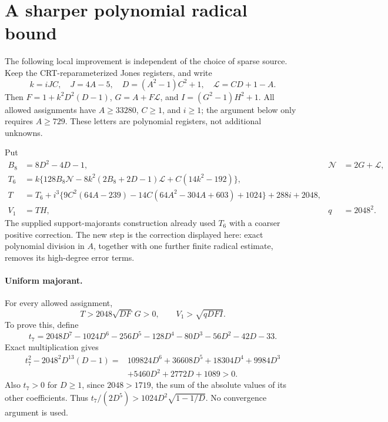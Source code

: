 \section{A sharper polynomial radical bound}\label{sec:quotient-majorant}

The following local improvement is independent of the choice of sparse
source.  Keep the CRT-reparameterized Jones registers, and write
\[
 k=iJC,\quad J=4A-5,\quad D=(A^2-1)C^2+1,\quad
 \mathcal L=CD+1-A.
\]
Then $F=1+k^2D^2(D-1)$, $G=A+F\mathcal L$, and
$I=(G^2-1)H^2+1$.  All allowed assignments have $A\ge33280$,
$C\ge1$, and $i\ge1$; the argument below only requires $A\ge729$.
These letters are polynomial registers, not additional unknowns.

Put
\begin{align*}
 B_8&=8D^2-4D-1, &\mathcal N&=2G+\mathcal L,\\
 T_6&=k\{128B_8\mathcal N
       -8k^2(2B_8+2D-1)\mathcal L+C(14k^2-192)\},\\
 T&=T_6+i^3\{9C^2(64A-239)
       -14C(64A^2-304A+603)+1024\}+288i+2048,\\
 V_1&=TH, &q&=2048^2.
\end{align*}
The supplied support-majorants construction already used $T_6$ with a
coarser positive correction.  The new step is the correction displayed
here: exact polynomial division in $A$, together with one further finite
radical estimate, removes its high-degree error terms.

\paragraph{Uniform majorant.}
For every allowed assignment,
\begin{equation}\label{eq:new-majorant}
 T>2048\sqrt{DF}\,G>0,\qquad V_1>\sqrt{qDFI}.
\end{equation}
To prove this, define
\[
 t_7=2048D^7-1024D^6-256D^5-128D^4-80D^3-56D^2-42D-33.
\]
Exact multiplication gives
\begin{align*}
 t_7^2-2048^2D^{13}(D-1)
 ={}&109824D^6+36608D^5+18304D^4+9984D^3\\
   &+5460D^2+2772D+1089>0.
\end{align*}
Also $t_7>0$ for $D\ge1$, since $2048>1719$, the sum of the absolute
values of its other coefficients.  Thus
$t_7/(2D^5)>1024D^2\sqrt{1-1/D}$.
No convergence argument is used.

